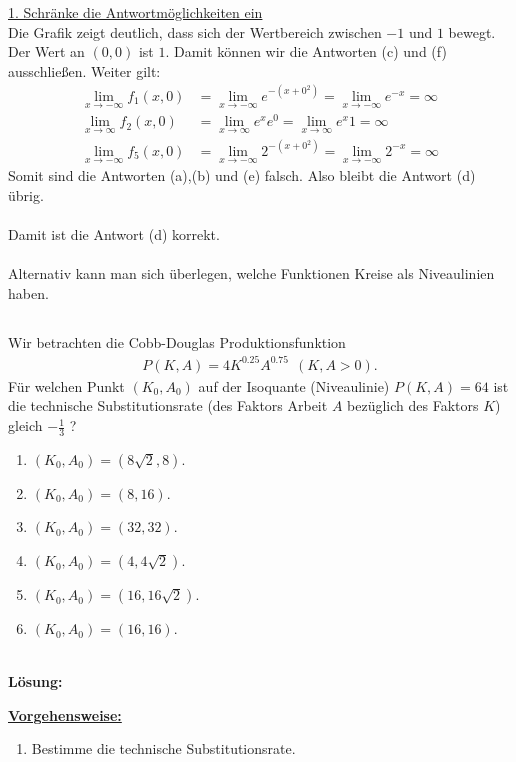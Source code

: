 \underline{1. Schränke die Antwortmöglichkeiten ein}\\
Die Grafik zeigt deutlich, dass sich der Wertbereich zwischen $ -1 $ und $ 1 $ bewegt. Der Wert an $ (0,0) $ ist $ 1 $.
Damit können wir die Antworten (c) und (f) ausschließen.
Weiter gilt:
\begin{align*}
	\lim \limits_{x \to -\infty}
	f_1(x,0) 
	&=
	\lim \limits_{x \to -\infty} e^{-(x +0^2)} 
	= 
	\lim \limits_{x \to -\infty} e^{-x} = \infty\\
	\lim \limits_{x \to \infty}
	f_2(x,0) 
	&=
	\lim \limits_{x \to \infty}
	e^x e^0 
	=
	\lim \limits_{x \to \infty}
	e^x 1 
	=
	\infty\\
		\lim \limits_{x \to -\infty}
	f_5(x,0) 
	&=
	\lim \limits_{x \to -\infty} 2^{-(x +0^2)} 
	= 
	\lim \limits_{x \to -\infty} 2^{-x} = \infty
\end{align*}
Somit sind die Antworten (a),(b) und (e) falsch. Also bleibt die Antwort (d) übrig.\\
\\
Damit ist die Antwort (d) korrekt.
\\
\\
Alternativ kann man sich überlegen, welche Funktionen Kreise als Niveaulinien haben.


\newpage

\subsection*{}
Wir betrachten die Cobb-Douglas Produktionsfunktion
\begin{align*}
	P(K,A) 
	=
	4 K^{0.25} A^{0.75} \ \ (K,A > 0).
\end{align*}
Für welchen Punkt $ (K_0, A_0) $ auf der Isoquante (Niveaulinie) $ P(K,A) = 64 $ ist die technische Substitutionsrate (des Faktors Arbeit $ A $ bezüglich des Faktors $ K $) gleich $ - \frac{1}{3} $ ?
\renewcommand{\labelenumi}{(\alph{enumi})}
\begin{enumerate}
	\item 
	$ (K_0, A_0) = ( 8 \sqrt{2}, 8 ) $.
	\item
	$ (K_0, A_0) = ( 8 , 16 )$.
	\item
	$ (K_0, A_0) = ( 32 , 32)$.
	\item
	$ (K_0, A_0) = ( 4 , 4\sqrt{2})$.
	\item
	$ (K_0, A_0) = ( 16 , 16\sqrt{2})$.
	\item
	$ (K_0, A_0) = ( 16 , 16)$.
\end{enumerate}
\ \\
\textbf{Lösung:}
\begin{mdframed}
\underline{\textbf{Vorgehensweise:}}
\renewcommand{\labelenumi}{\theenumi.}
\begin{enumerate}
\item Bestimme die technische Substitutionsrate.
\end{enumerate}
\end{mdframed}

